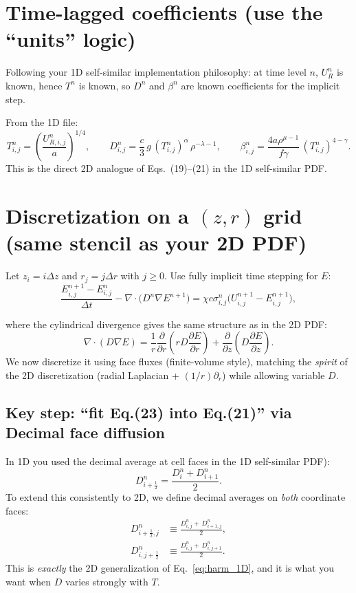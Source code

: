 \documentclass[11pt]{article}
\begin{document}
\section{Time-lagged coefficients (use the ``units'' logic)}
Following your 1D self-similar implementation philosophy: at time level $n$, $U_R^n$ is known, hence $T^n$ is known,
so $D^n$ and $\beta^n$ are known coefficients for the implicit step.

From the 1D file:
\begin{equation}
T^n_{i,j}=\left(\frac{U_{R,i,j}^n}{a}\right)^{1/4}, \qquad
D^n_{i,j}= \frac{c}{3}\,g\,(T^n_{i,j})^\alpha\,\rho^{-\lambda-1}, \qquad
\beta^n_{i,j}= \frac{4a\rho^{\mu-1}}{f\gamma}\,(T^n_{i,j})^{4-\gamma}. \label{eq:lagged_coeffs}
\end{equation}
This is the direct 2D analogue of Eqs.~(19)--(21) in the 1D self-similar PDF.

\section{Discretization on a $(z,r)$ grid (same stencil as your 2D PDF)}
Let $z_i=i\Delta z$ and $r_j=j\Delta r$ with $j\ge 0$.
Use fully implicit time stepping for $E$:
\begin{equation}
\frac{E^{n+1}_{i,j}-E^n_{i,j}}{\Delta t} - \nabla\cdot\big(D^n\nabla E^{n+1}\big)
= \chi c\sigma^n_{i,j}\big(U^{n+1}_{i,j}-E^{n+1}_{i,j}\big), \label{eq::transportEq}
\end{equation}

where the cylindrical divergence gives the same structure as in the 2D PDF:
\[
\nabla\cdot(D\nabla E)=
\frac{1}{r}\frac{\partial}{\partial r}\left(r D\frac{\partial E}{\partial r}\right)
+\frac{\partial}{\partial z}\left(D\frac{\partial E}{\partial z}\right).
\]
We now discretize it using face fluxes (finite-volume style), matching the \emph{spirit} of the 2D discretization (radial Laplacian + $(1/r)\partial_r$) while allowing variable $D$.

\subsection{Key step: ``fit Eq.(23) into Eq.(21)'' via Decimal face diffusion}
In 1D you used the decimal average at cell faces in the 1D self-similar PDF):
\begin{equation}
D^n_{i+\frac12}=\frac{D^n_i + D^n_{i+1}}{2}. \label{eq:harm_1D}
\end{equation}
To extend this consistently to 2D, we define decimal averages on \emph{both} coordinate faces:
\begin{align}
D^{n}_{i+\frac12,j} &\equiv \frac{D^n_{i,j}+\,D^n_{i+1,j}}{2}, \label{eq:harm_z}\\
D^{n}_{i,j+\frac12} &\equiv \frac{D^n_{i,j}+\,D^n_{i,j+1}}{2}. \label{eq:harm_r}
\end{align}
This is \emph{exactly} the 2D generalization of Eq.~\eqref{eq:harm_1D}, and it is what you want when $D$ varies strongly with $T$.
\end{document}
